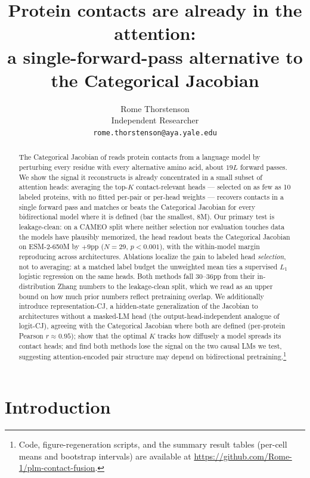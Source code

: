 \documentclass{article}
\title{Protein contacts are already in the attention: \\
a single-forward-pass alternative to the Categorical Jacobian}
\author{%
  Rome Thorstenson\\
  Independent Researcher\\
  \texttt{rome.thorstenson@aya.yale.edu}\\
}
\begin{document}
\maketitle

\begin{abstract}
\noindent
The Categorical Jacobian of \citet{zhang2024cj} reads protein contacts
from a language model by perturbing every residue with every alternative
amino acid, about $19L$ forward passes. We show the signal it reconstructs
is already concentrated in a small subset of attention heads: averaging
the top-$K$ contact-relevant heads --- selected on as few as 10 labeled
proteins, with no fitted per-pair or per-head weights --- recovers
contacts in a single forward pass and matches or beats the Categorical
Jacobian for every bidirectional model where it is defined (bar the
smallest, 8M). Our primary test is
leakage-clean: on a CAMEO split where neither selection nor evaluation
touches data the models have plausibly memorized, the head readout beats
the Categorical Jacobian on ESM-2-650M by $+9$pp ($N{=}29$, $p<0.001$),
with the within-model margin reproducing across architectures. Ablations
localize the gain to labeled head \emph{selection}, not to averaging: at
a matched label budget the unweighted mean ties a supervised $L_1$
logistic regression on the same heads. Both methods fall 30--36pp from
their in-distribution Zhang numbers to the leakage-clean split, which we
read as an upper bound on how much prior numbers reflect pretraining
overlap. We additionally introduce representation-CJ, a hidden-state
generalization of the Jacobian to architectures without a masked-LM head
(the output-head-independent analogue of logit-CJ), agreeing with the
Categorical Jacobian where both are defined (per-protein Pearson $r \approx 0.95$); show that
the optimal $K$ tracks how diffusely a model spreads its contact heads;
and find both methods lose the signal on the two causal LMs we test,
suggesting attention-encoded pair structure may depend on bidirectional
pretraining.\footnote{Code, figure-regeneration
scripts, and the summary result tables (per-cell means and bootstrap
intervals) are available at
\url{https://github.com/Rome-1/plm-contact-fusion}.}
\end{abstract}

\section{Introduction}
\end{document}
